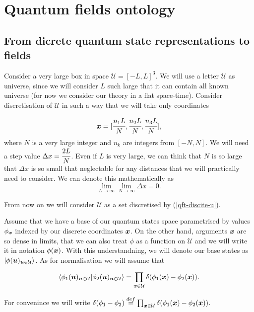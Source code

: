 \documentclass[main.tex]{subfiles}
\begin{document}
\section{Quantum fields ontology}

\subsection{From dicrete quantum state representations to fields}

Consider a very large box in space $\mathcal{U} = [-L, L]^3$. 
We will use a letter $\mathcal{U}$ as universe, since we will consider $L$ such large that it can contain all known universe (for now we consider our theory in a flat space-time). Consider discretisation of $\mathcal{U}$ in such a way that we will take only coordinates

\begin{equation}
\label{qft-discite-u}
\boldsymbol{x} = [\cfrac{n_1L}{N}, \cfrac{n_2L}{N}, \cfrac{n_3L}{N}], 
\end{equation}
where $N$ is a very large integer and $n_k$ are integers from $[-N, N]$. We will need a step value $\Delta  x = \cfrac{2L}{N}$. Even if $L$ is very large, we can think that $N$ is so large that $\Delta x$ is so small that neglectable for any distances that we will practically need to consider. We can denote this mathematically as
\begin{equation}
\lim_{L\to \infty}\lim_{N\to\infty} \Delta x = 0.
\end{equation}

From now on we will consider $\mathcal{U}$ as a set discretised by (\ref{qft-discite-u}).

Assume that we have a base of our quantum states space parametrised by values $\phi_{\boldsymbol{x}}$ indexed by our discrete coordinates $\boldsymbol{x}$. On the other hand, arguments $\boldsymbol{x}$ are so dense in limits, that we can also treat $\phi$ as a function on $\mathcal{U}$ and we will write it in notation $\phi(\boldsymbol{x})$. With this understandning, we will denote our base states as $\ket{\phi(\boldsymbol{u})_{\boldsymbol{u}\in \mathcal{U}}}$. As for normalisation we will assume that 

\begin{equation}
\bra{\phi_1(\boldsymbol{u})_{\boldsymbol{u}\in \mathcal{U}}} \ket{\phi_2(\boldsymbol{u})_{\boldsymbol{u}\in \mathcal{U}}} 
= \prod_{\boldsymbol{x}\in \mathcal{U}} \delta(\phi_1(\boldsymbol{x}) - \phi_2(\boldsymbol{x})).
\end{equation}

For convenince we will write $\delta(\phi_1 - \phi_2) \stackrel{def}{=} \prod_{\boldsymbol{x}\in \mathcal{U}} \delta(\phi_1(\boldsymbol{x}) - \phi_2(\boldsymbol{x}))$.
\end{document}
